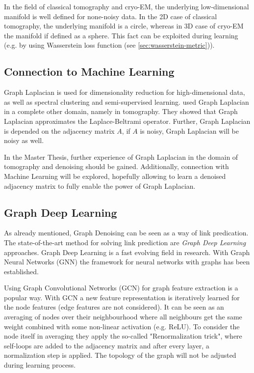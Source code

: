 \begin{tcolorbox}[colback=red!5!white,colframe=red!75!black]
    In the field of classical tomography and cryo-EM, the underlying low-dimensional manifold is well defined for none-noisy data.
    In the 2D case of classical tomography, the underlying manifold is a circle, whereas in 3D case of cryo-EM the manifold
    if defined as a sphere.
    This fact can be exploited during learning (e.g. by using Wasserstein loss function (see \ref{sec:wasserstein-metric})).
\end{tcolorbox}

\subsection{Connection to Machine Learning}

Graph Laplacian is used for dimensionality reduction for high-dimensional data, as well as spectral clustering and semi-supervised learning.
\citet{LaplaceRandomProjections} used Graph Laplacian in a complete other domain, namely in tomography. 
They showed that Graph Laplacian approximates the Laplace-Beltrami operator.
Further, Graph Laplacian is depended on the adjacency matrix $A$, if $A$ is noisy, Graph Laplacian will be noisy as well.


\begin{tcolorbox}[colback=red!5!white,colframe=red!75!black]
    In the Master Thesis, further experience of Graph Laplacian in the domain of tomography and denoising
    should be gained. Additionally, connection with Machine Learning will be explored, hopefully allowing to learn a denoised 
    adjacency matrix to fully enable the power of Graph Laplacian.
\end{tcolorbox}


\subsection{Graph Deep Learning}
As already mentioned, Graph Denoising can be seen as a way of link predication. 
The state-of-the-art method for solving link prediction are \textit{Graph Deep Learning} approaches.
Graph Deep Learning is a fast evolving field in research. With Graph Neural Networks (GNN) \cite{GNN} the framework
for neural networks with graphs has been established. 

Using Graph Convolutional Networks (GCN) \cite{GCN} for graph feature extraction is a popular way. 
With GCN a new feature representation is iteratively learned for the node features (edge features are not considered).
It can be seen as an averaging of nodes over their neighbourhood where all neighbours get the same weight combined with some non-linear activation (e.g. ReLU). 
To consider the node itself in averaging they apply the so-called "Renormalization trick", where self-loops are added to the 
adjacency matrix and after every layer, a normalization step is applied. 
The topology of the graph will not be adjusted during  learning process.

